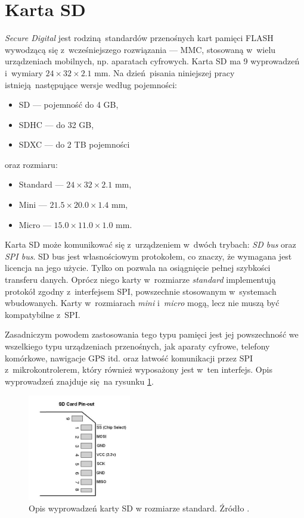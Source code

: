 \section{Karta SD}

\textit{Secure Digital} jest rodziną standardów przenośnych kart pamięci FLASH wywodzącą się z~wcześniejszego rozwiązania --- MMC, stosowaną w~wielu urządzeniach mobilnych, np. aparatach cyfrowych. Karta SD ma 9 wyprowadzeń i~wymiary $24 \times 32 \times 2.1$ mm. Na dzień pisania niniejszej pracy istnieją następujące wersje według pojemności:
\begin{itemize}
	\item SD --- pojemność do 4 GB,
	\item SDHC --- do 32 GB,
	\item SDXC --- do 2 TB pojemności
\end{itemize}
oraz rozmiaru:
\begin{itemize}
	\item Standard --- $ 24 \times 32 \times 2.1 $ mm,
	\item Mini --- $ 21.5 \times 20.0 \times 1.4 $ mm,
	\item Micro --- $ 15.0 \times 11.0 \times 1.0 $ mm.
\end{itemize}

Karta SD może komunikować się z~urządzeniem w~dwóch trybach: \textit{SD bus} oraz \textit{SPI bus}. SD bus jest własnościowym protokołem, co znaczy, że wymagana jest licencja na jego użycie. Tylko on pozwala na osiągnięcie pełnej szybkości transferu danych. Oprócz niego karty w~rozmiarze \textit{standard} implementują protokół zgodny z~interfejsem SPI, powszechnie stosowanym w~systemach wbudowanych. Karty w~rozmiarach \textit{mini} i~\textit{micro} mogą, lecz nie muszą być kompatybilne z~SPI.

Zasadniczym powodem zastosowania tego typu pamięci jest jej powszechność we wszelkiego typu urządzeniach przenośnych, jak aparaty cyfrowe, telefony komórkowe, nawigacje GPS itd. oraz łatwość komunikacji przez SPI z~mikrokontrolerem, który również wyposażony jest w~ten interfejs. Opis wyprowadzeń znajduje się na rysunku \ref{schemat-sd}. 

\begin{figure}[tb]
    \begin{center}
       \includegraphics[width=0.4\textwidth]{figures/SD_pinout.jpg}
    \end{center}

    \caption{Opis wyprowadzeń karty SD w rozmiarze standard. Źródło \cite{sd1}.}
    \label{schemat-sd}
\end{figure}

